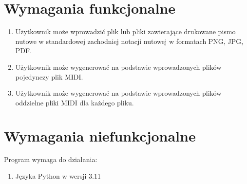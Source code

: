 \section{Wymagania funkcjonalne}
	\begin{enumerate}
		\item Użytkownik może wprowadzić plik lub pliki zawierające drukowane pismo nutowe w standardowej zachodniej notacji nutowej w formatach PNG, JPG, PDF.
		\item Użytkownik może wygenerować na podstawie wprowadzonych plików pojedynczy plik MIDI.
		\item Użytkownik może wygenerować na podstawie wprowadzonych plików oddzielne pliki MIDI dla każdego pliku.
	\end{enumerate}
	
	
\section{Wymagania niefunkcjonalne}
Program wymaga do działania:
	\begin{enumerate}
		\item Języka Python w wersji 3.11
	\end{enumerate}